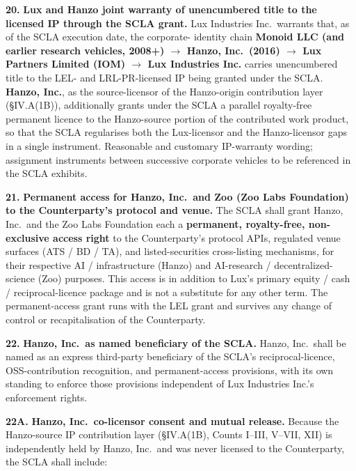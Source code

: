 \documentclass[11pt,letterpaper]{article}
\begin{document}
\textbf{20.} \textbf{Lux and Hanzo joint warranty of unencumbered
title to the licensed IP through the SCLA grant.} Lux Industries
Inc.\ warrants that, as of the SCLA execution date, the corporate-
identity chain \textbf{Monoid LLC (and earlier research vehicles,
2008+) $\rightarrow$ Hanzo, Inc.\ (2016) $\rightarrow$ Lux
Partners Limited (IOM) $\rightarrow$ Lux Industries Inc.}
carries unencumbered title to the LEL- and LRL-PR-licensed IP
being granted under the SCLA. \textbf{Hanzo, Inc.}, as the
source-licensor of the Hanzo-origin contribution layer
(\S IV.A(1B)), additionally grants under the SCLA a parallel
royalty-free permanent licence to the Hanzo-source portion of the
contributed work product, so that the SCLA regularises both the
Lux-licensor and the Hanzo-licensor gaps in a single instrument.
Reasonable and customary IP-warranty wording; assignment
instruments between successive corporate vehicles to be referenced
in the SCLA exhibits.

\textbf{21.} \textbf{Permanent access for Hanzo, Inc.\ and Zoo
(Zoo Labs Foundation) to the Counterparty's protocol and venue.}
The SCLA shall grant Hanzo, Inc.\ and the Zoo Labs Foundation
each a \textbf{permanent, royalty-free, non-exclusive access
right} to the Counterparty's protocol APIs, regulated venue
surfaces (ATS / BD / TA), and listed-securities cross-listing
mechanisms, for their respective AI / infrastructure (Hanzo) and
AI-research / decentralized-science (Zoo) purposes. This access
is in addition to Lux's primary equity / cash / reciprocal-licence
package and is not a substitute for any other term. The
permanent-access grant runs with the LEL grant and survives any
change of control or recapitalisation of the Counterparty.

\textbf{22.} \textbf{Hanzo, Inc.\ as named beneficiary of the
SCLA.} Hanzo, Inc.\ shall be named as an express third-party
beneficiary of the SCLA's reciprocal-licence, OSS-contribution
recognition, and permanent-access provisions, with its own
standing to enforce those provisions independent of Lux Industries
Inc.'s enforcement rights.

\textbf{22A.} \textbf{Hanzo, Inc.\ co-licensor consent and mutual
release.} Because the Hanzo-source IP contribution layer
(\S IV.A(1B), Counts I--III, V--VII, XII) is independently held
by Hanzo, Inc.\ and was never licensed to the Counterparty, the
SCLA shall include:
\end{document}
